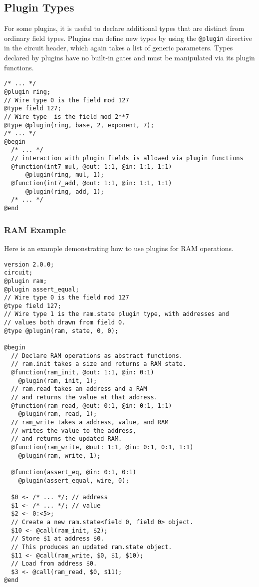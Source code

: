 \subsection{Plugin Types}
%
For some plugins, it is useful to declare additional types that are distinct from ordinary field types.
Plugins can define new types by using the 
\texttt{@plugin} directive in the circuit header, which again takes a list of generic parameters. 
Types declared by plugins have no built-in gates and must be manipulated via its plugin functions.
%
\begin{lstlisting}[language=ir]
/* ... */
@plugin ring;
// Wire type 0 is the field mod 127
@type field 127;
// Wire type  is the field mod 2**7
@type @plugin(ring, base, 2, exponent, 7);
/* ... */
@begin
  /* ... */
  // interaction with plugin fields is allowed via plugin functions
  @function(int7_mul, @out: 1:1, @in: 1:1, 1:1)
      @plugin(ring, mul, 1);
  @function(int7_add, @out: 1:1, @in: 1:1, 1:1)
      @plugin(ring, add, 1);
  /* ... */
@end
\end{lstlisting}

\subsubsection{RAM Example}

Here is an example demonstrating how to use plugins for RAM operations. %

\begin{lstlisting}[language=ir]
version 2.0.0;
circuit;
@plugin ram;
@plugin assert_equal;
// Wire type 0 is the field mod 127
@type field 127;
// Wire type 1 is the ram.state plugin type, with addresses and
// values both drawn from field 0.
@type @plugin(ram, state, 0, 0);

@begin
  // Declare RAM operations as abstract functions.
  // ram.init takes a size and returns a RAM state.
  @function(ram_init, @out: 1:1, @in: 0:1) 
    @plugin(ram, init, 1);
  // ram.read takes an address and a RAM
  // and returns the value at that address.
  @function(ram_read, @out: 0:1, @in: 0:1, 1:1)
    @plugin(ram, read, 1);
  // ram_write takes a address, value, and RAM
  // writes the value to the address,
  // and returns the updated RAM.
  @function(ram_write, @out: 1:1, @in: 0:1, 0:1, 1:1)
    @plugin(ram, write, 1);

  @function(assert_eq, @in: 0:1, 0:1)
    @plugin(assert_equal, wire, 0);

  $0 <- /* ... */; // address
  $1 <- /* ... */; // value
  $2 <- 0:<5>;
  // Create a new ram.state<field 0, field 0> object.
  $10 <- @call(ram_init, $2);
  // Store $1 at address $0.
  // This produces an updated ram.state object.
  $11 <- @call(ram_write, $0, $1, $10);
  // Load from address $0.
  $3 <- @call(ram_read, $0, $11);
@end
\end{lstlisting}

